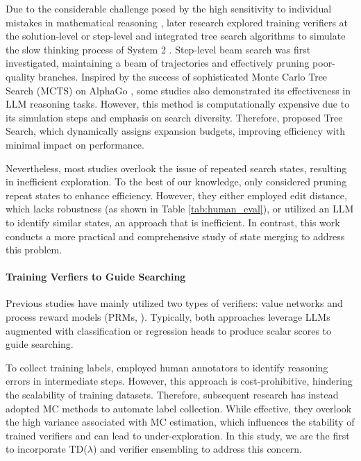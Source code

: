 Due to the considerable challenge posed by the high sensitivity to individual mistakes in mathematical reasoning \citep{shen2021generate}, later research explored training verifiers at the solution-level or step-level and integrated tree search algorithms \citep{yao2024tree,kang2024mindstar} to simulate the slow thinking process of System 2 \citep{kahneman2011thinking}.
Step-level beam search \citep{zhu2024deductive,yu2024ovm} was first investigated, maintaining a beam of trajectories and effectively pruning poor-quality branches.
Inspired by the success of sophisticated Monte Carlo Tree Search (MCTS) on AlphaGo \citep{silver2016mastering}, some studies \citep{tian2024toward,zhang2024accessing} also demonstrated its effectiveness in LLM reasoning tasks.
However, this method is computationally expensive due to its simulation steps and emphasis on search diversity.
Therefore, \citet{wang2024litesearch} proposed Tree Search, which dynamically assigns expansion budgets, improving efficiency with minimal impact on performance.

Nevertheless, most studies overlook the issue of repeated search states, resulting in inefficient exploration.
To the best of our knowledge, only \citet{tian2024toward} considered pruning repeat states to enhance efficiency.
However, they either employed edit distance, which lacks robustness (as shown in Table \ref{tab:human_eval}), or utilized an LLM to identify similar states, an approach that is inefficient.
In contrast, this work conducts a more practical and comprehensive study of state merging to address this problem.

\fi

\paragraph{Training Verfiers to Guide Searching}
Previous studies have mainly utilized two types of verifiers: value networks \citep{yu2024ovm,tian2024toward} and process reward models (PRMs, \citealt{lightman2023let,wang2023math}).
Typically, both approaches leverage LLMs augmented with classification or regression heads to produce scalar scores to guide searching.

To collect training labels, \citet{lightman2023let} employed human annotators to identify reasoning errors in intermediate steps.
However, this approach is cost-prohibitive, hindering the scalability of training datasets.
Therefore, subsequent research \citep{yu2024ovm,wang2023math,tian2024toward,wang2024litesearch} has instead adopted MC methods to automate label collection.
While effective, they overlook the high variance associated with MC estimation, which influences the stability of trained verifiers and can lead to under-exploration.
In this study, we are the first to incorporate TD($\lambda$) and verifier ensembling to address this concern.

